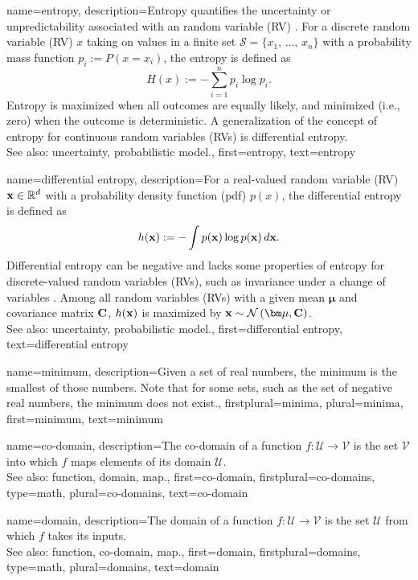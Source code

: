 {
{name={entropy},
	description={Entropy quantifies the uncertainty or unpredictability associated with an random variable (RV) \cite{coverthomas}. 
		For a discrete random variable (RV) $x$ taking on values in a finite set $\mathcal{S} = \{x_1, \,\ldots, \,x_n\}$ with 
		a probability mass function $p_i := P\left(x = x_i\right)$, the entropy is defined as
		\[
		H(x) := -\sum_{i=1}^n p_i \log p_i.
		\]
		Entropy is maximized when all outcomes are equally likely, and minimized (i.e., zero) 
		when the outcome is deterministic. A generalization of the concept of entropy for continuous 
		random variables (RVs) is differential entropy. 
		\\
		See also: uncertainty, probabilistic model.},
	first={entropy},
	text={entropy}
}

{name={differential entropy},
	description={For a real-valued random variable (RV) ${\bf x} \in \mathbb{R}^{d}$ 
		with a probability density function (pdf) $p(x)$, the differential entropy is defined as \cite{coverthomas}
		\[
		h({\bf x}) := - \int p({\bf x}) \log p({\bf x}) \, d{\bf x}.
		\]
		Differential entropy can be negative and lacks some properties of entropy for 
		discrete-valued random variables (RVs), such as invariance under a change of variables \cite{coverthomas}. 
		Among all random variables (RVs) with a given mean ${\bm \mu}$ and covariance matrix ${\bf C}$, 
		$h({\bf x})$ is maximized by ${\bf x} \sim \mathcal{N}\left({\bm \mu},{\bf C}\right)$. 
		\\
		See also: uncertainty, probabilistic model.},
	first={differential entropy},
	text={differential entropy}
}

{name={minimum},
	description={Given a set of real numbers, the minimum is the smallest of those numbers.
		Note that for some sets, such as the set of negative real numbers, the minimum does not exist.},
	firstplural={minima}, 
 	plural={minima},
	first={minimum},
	text={minimum}
}


{name={co-domain}, 
	description={The co-domain of a function 
	$f: \mathcal{U} \rightarrow \mathcal{V}$ is the set $\mathcal{V}$ 
		into which $f$ maps elements of its domain $\mathcal{U}$.  
		\\
		See also: function, domain, map.},
	first={co-domain},
	firstplural={co-domains}, 
	type=math, 
	plural={co-domains},
	text={co-domain}
}

{name={domain}, 
	description={The domain of a function 
	$f: \mathcal{U} \rightarrow \mathcal{V}$ is the set $\mathcal{U}$ 
		from which $f$ takes its inputs.  
		\\
		See also: function, co-domain, map.},
	first={domain},
	firstplural={domains}, 
	type=math, 
	plural={domains},
	text={domain}
}	
	

}
